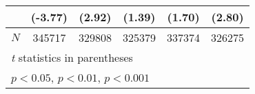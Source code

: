 \begin{table}[htbp]
\begin{tabular}{l*{5}{c}}
            &     (-3.77)         &      (2.92)         &      (1.39)         &      (1.70)         &      (2.80)         \\
\hline
\(N\)       &      345717         &      329808         &      325379         &      337374         &      326275         \\
\hline\hline
\multicolumn{6}{l}{\footnotesize \textit{t} statistics in parentheses}\\
\multicolumn{6}{l}{\footnotesize \sym{*} \(p<0.05\), \sym{**} \(p<0.01\), \sym{***} \(p<0.001\)}\\
\end{tabular}
\label{tab:oaxaca_male}
\end{table}
